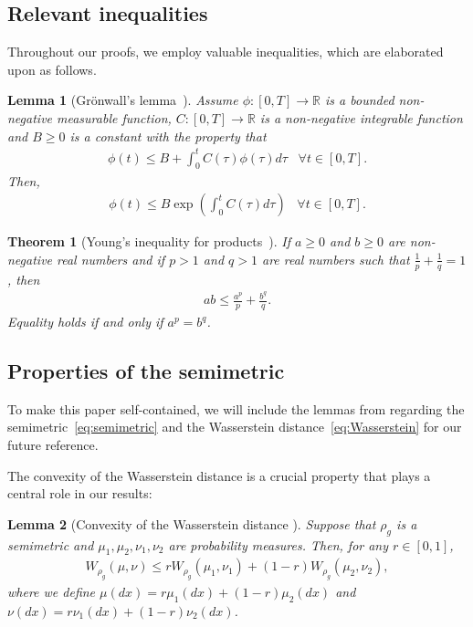 \documentclass{article}
\newtheorem{theorem}{Theorem}
\newtheorem{lemma}{Lemma}
\begin{document}
\subsection{Relevant inequalities}
Throughout our proofs, we employ valuable inequalities, which are elaborated upon as follows.
\begin{lemma}[Gr\"onwall's lemma~\citep{Gronwall}]
	Assume $\phi: [0, T] \rightarrow \mathbb{R}$ is a bounded non-negative measurable function, $C:[0,T] \rightarrow \mathbb{R}$ is a non-negative integrable function and $B \geq 0$ is a constant with the property that 
	\begin{align*}
		\phi(t) \leq B + \int_0^t C(\tau) \phi(\tau)d\tau \;\;\; \forall t \in [0,T].
	\end{align*}
	Then,
	\begin{align*}
		\phi(t) \leq B \exp \left(\int_0^t C(\tau) d\tau \right) \;\;\; \forall t \in [0,T].
	\end{align*}
\end{lemma}

\begin{theorem}[Young's inequality for products~\citep{Young}]
	If $a \geq 0$ and $b \geq 0$ are non-negative real numbers and if $p > 1$ and $q>1$ are real numbers such that $\frac{1}{p} + \frac{1}{q} = 1$, then
	\begin{align*}
		ab \leq \frac{a^p}{p} + \frac{b^q}{q}.
	\end{align*}
	Equality holds if and only if $a^p = b^q$.
\end{theorem}


\subsection{Properties of the semimetric}\label{appendix:semimetric}

To make this paper self-contained, we will include the lemmas from \citet{Farghly} regarding the semimetric~\eqref{eq:semimetric} and the Wasserstein distance~\eqref{eq:Wasserstein} for our future reference.

The convexity of the Wasserstein distance is a crucial property that plays a central role in our results:
\begin{lemma}[Convexity of the Wasserstein distance {\citep[Lemma 2.3]{Farghly}}]\label{Lemma2.3}
	Suppose that $\rho_g$ is a semimetric and $\mu_1, \mu_2, \nu_1, \nu_2$ are probability measures. Then, for any $r \in [0,1]$,
	\begin{align*}
		W_{\rho_g} (\mu, \nu) \leq r W_{\rho_g} (\mu_1, \nu_1) + (1-r) W_{\rho_g} (\mu_2, \nu_2),
	\end{align*}
	where we define $\mu(dx) = r\mu_1 (dx) + (1-r) \mu_2(dx)$ and $\nu(dx) = r\nu_1(dx) + (1-r) \nu_2 (dx)$.
\end{lemma}
\end{document}
